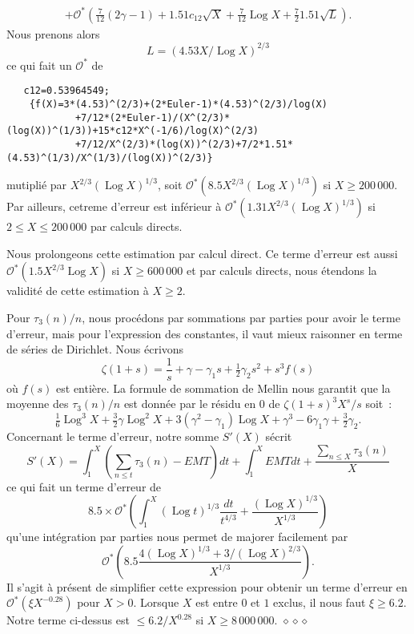 \documentclass[12pt,a4paper,twoside]{article}
\newenvironment{dem}{\medbreak\noindent{\sc Preuve : }}%
{\hfill $\diamond\diamond\diamond$\par\medbreak}
\def\Ocal{\mathcal{O}}
\DeclareMathOperator{\Log}{Log}
\begin{document}
\begin{dem}
\begin{multline*}
    \\+\Ocal^*(\tfrac7{12}(2\gamma-1)+1.51c_{12}\sqrt{X}
    +\tfrac7{12}\Log X+\tfrac721.51\sqrt{L}).
  \end{multline*}
  Nous prenons alors 
  \begin{equation}
    L=(4.53 X/\Log X)^{2/3}
  \end{equation}
  ce qui fait un $\Ocal^*$ de
\begin{verbatim}
   c12=0.53964549;
    {f(X)=3*(4.53)^(2/3)+(2*Euler-1)*(4.53)^(2/3)/log(X)
            +7/12*(2*Euler-1)/(X^(2/3)*(log(X))^(1/3))+15*c12*X^(-1/6)/log(X)^(2/3)
            +7/12/X^(2/3)*(log(X))^(2/3)+7/2*1.51*(4.53)^(1/3)/X^(1/3)/(log(X))^(2/3)}
\end{verbatim}
 mutipli\'e par $X^{2/3}(\Log X)^{1/3}$, soit
 $\Ocal^*(8.5X^{2/3}(\Log X)^{1/3})$ si $X\ge 200\,000$. Par ailleurs, cetreme
 d'erreur est inf\'erieur \`a $\Ocal^*(1.31X^{2/3}(\Log X)^{1/3})$ si
 $2\le X\le 200\,000$ par calculs directs.

 Nous prolongeons
 cette estimation par calcul direct. Ce terme d'erreur est aussi 
 $\Ocal^*(1.5X^{2/3}\Log X)$ si $X\ge 600\,000$ et par calculs directs, nous \'etendons
 la validit\'e de cette estimation \`a $X\ge2$.

 Pour $\tau_3(n)/n$, nous proc\'edons par sommations par parties pour avoir le terme d'erreur,
 mais pour l'expression des constantes, il vaut mieux raisonner en terme de s\'eries de
 Dirichlet. Nous \'ecrivons
 \begin{equation*}
   \zeta(1+s)=\frac1s+\gamma-\gamma_1 s+\tfrac12\gamma_2 s^2 +s^3f(s)
 \end{equation*}
 o\`u $f(s)$ est enti\`ere. La formule de sommation de Mellin nous
 garantit que la moyenne des $\tau_3(n)/n$ est donn\'ee par le
 r\'esidu en 0 de $\zeta(1+s)^3X^s/s$ soit~:
 \begin{equation*}
   \tfrac16\Log^3 X+ \tfrac32\gamma\Log^2 X + 3(\gamma^2-\gamma_1 )\Log X
   +\gamma^3  - 6\gamma_1\gamma+ \tfrac32\gamma_2. 
 \end{equation*}
 Concernant le terme d'erreur, notre somme $S'(X)$ s\'ecrit
 \begin{equation*}
   S'(X)=\int_{1}^X(\sum_{n\le t}\tau_3(n)-EMT)dt+\int_{1}^XEMTdt
   +\frac{\sum_{n\le X}\tau_3(n)}{X}
 \end{equation*}
 ce qui fait un terme d'erreur de
 \begin{equation*}
   8.5\times\Ocal^*\left(\int_1^X(\Log t)^{1/3}\frac{dt}{t^{4/3}}+\frac{(\Log X)^{1/3}}{X^{1/3}}
   \right)
 \end{equation*}
 qu'une int\'egration par parties nous permet de majorer facilement par
 \begin{equation*}
   \Ocal^*\left(8.5\frac{4(\Log X)^{1/3}+3/(\Log X)^{2/3}}{X^{1/3}}\right).
 \end{equation*}
 Il s'agit \`a pr\'esent de simplifier cette expression pour obtenir
 un terme d'erreur en $\Ocal^*(\xi X^{-0.28})$ pour $X>0$. Lorsque $X$
 est entre $0$ et $1$ exclus, il nous faut $\xi\ge6.2$.
 Notre terme ci-dessus est $\le 6.2/X^{0.28}$ si $X\ge8\,000\,000$.
\end{dem}
\end{document}
